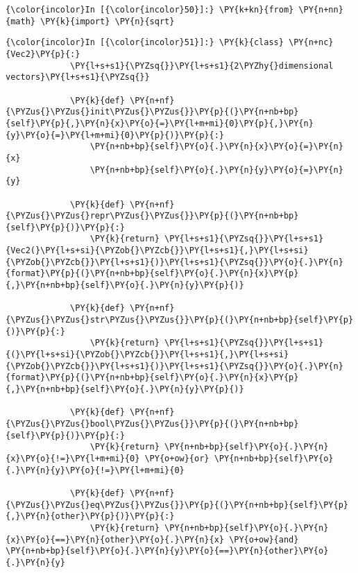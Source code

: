    \begin{Verbatim}[commandchars=\\\{\}]
{\color{incolor}In [{\color{incolor}50}]:} \PY{k+kn}{from} \PY{n+nn}{math} \PY{k}{import} \PY{n}{sqrt}
\end{Verbatim}

    \begin{Verbatim}[commandchars=\\\{\}]
{\color{incolor}In [{\color{incolor}51}]:} \PY{k}{class} \PY{n+nc}{Vec2}\PY{p}{:}
             \PY{l+s+s1}{\PYZsq{}}\PY{l+s+s1}{2\PYZhy{}dimensional vectors}\PY{l+s+s1}{\PYZsq{}}
             
             \PY{k}{def} \PY{n+nf}{\PYZus{}\PYZus{}init\PYZus{}\PYZus{}}\PY{p}{(}\PY{n+nb+bp}{self}\PY{p}{,}\PY{n}{x}\PY{o}{=}\PY{l+m+mi}{0}\PY{p}{,}\PY{n}{y}\PY{o}{=}\PY{l+m+mi}{0}\PY{p}{)}\PY{p}{:}
                 \PY{n+nb+bp}{self}\PY{o}{.}\PY{n}{x}\PY{o}{=}\PY{n}{x}
                 \PY{n+nb+bp}{self}\PY{o}{.}\PY{n}{y}\PY{o}{=}\PY{n}{y}
             
             \PY{k}{def} \PY{n+nf}{\PYZus{}\PYZus{}repr\PYZus{}\PYZus{}}\PY{p}{(}\PY{n+nb+bp}{self}\PY{p}{)}\PY{p}{:}
                 \PY{k}{return} \PY{l+s+s1}{\PYZsq{}}\PY{l+s+s1}{Vec2(}\PY{l+s+si}{\PYZob{}\PYZcb{}}\PY{l+s+s1}{,}\PY{l+s+si}{\PYZob{}\PYZcb{}}\PY{l+s+s1}{)}\PY{l+s+s1}{\PYZsq{}}\PY{o}{.}\PY{n}{format}\PY{p}{(}\PY{n+nb+bp}{self}\PY{o}{.}\PY{n}{x}\PY{p}{,}\PY{n+nb+bp}{self}\PY{o}{.}\PY{n}{y}\PY{p}{)}
             
             \PY{k}{def} \PY{n+nf}{\PYZus{}\PYZus{}str\PYZus{}\PYZus{}}\PY{p}{(}\PY{n+nb+bp}{self}\PY{p}{)}\PY{p}{:}
                 \PY{k}{return} \PY{l+s+s1}{\PYZsq{}}\PY{l+s+s1}{(}\PY{l+s+si}{\PYZob{}\PYZcb{}}\PY{l+s+s1}{,}\PY{l+s+si}{\PYZob{}\PYZcb{}}\PY{l+s+s1}{)}\PY{l+s+s1}{\PYZsq{}}\PY{o}{.}\PY{n}{format}\PY{p}{(}\PY{n+nb+bp}{self}\PY{o}{.}\PY{n}{x}\PY{p}{,}\PY{n+nb+bp}{self}\PY{o}{.}\PY{n}{y}\PY{p}{)}
             
             \PY{k}{def} \PY{n+nf}{\PYZus{}\PYZus{}bool\PYZus{}\PYZus{}}\PY{p}{(}\PY{n+nb+bp}{self}\PY{p}{)}\PY{p}{:}
                 \PY{k}{return} \PY{n+nb+bp}{self}\PY{o}{.}\PY{n}{x}\PY{o}{!=}\PY{l+m+mi}{0} \PY{o+ow}{or} \PY{n+nb+bp}{self}\PY{o}{.}\PY{n}{y}\PY{o}{!=}\PY{l+m+mi}{0}
             
             \PY{k}{def} \PY{n+nf}{\PYZus{}\PYZus{}eq\PYZus{}\PYZus{}}\PY{p}{(}\PY{n+nb+bp}{self}\PY{p}{,}\PY{n}{other}\PY{p}{)}\PY{p}{:}
                 \PY{k}{return} \PY{n+nb+bp}{self}\PY{o}{.}\PY{n}{x}\PY{o}{==}\PY{n}{other}\PY{o}{.}\PY{n}{x} \PY{o+ow}{and} \PY{n+nb+bp}{self}\PY{o}{.}\PY{n}{y}\PY{o}{==}\PY{n}{other}\PY{o}{.}\PY{n}{y}
             

\end{Verbatim}
